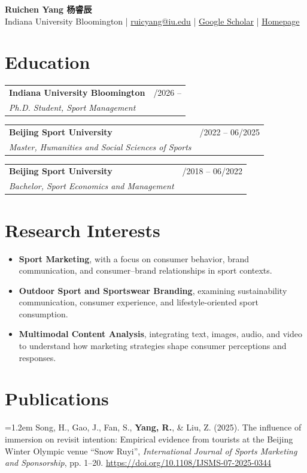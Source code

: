 \documentclass[11pt,letterpaper]{article}
\makeatletter
\newcommand{\entry}[4]{%
  \begin{tabularx}{\textwidth}{@{}>{\raggedright\arraybackslash}X>{\raggedleft\arraybackslash}p{1.45in}@{}}
    \textbf{#1} & #2 \\
    \textit{#3} & #4 \\
  \end{tabularx}
}
\newcommand{\publication}[1]{%
  \hangindent=1.2em
  \hangafter=1
  #1\par\vspace{0.45em}
}
\makeatother
\begin{document}
\begin{center}
  {\LARGE\bfseries Ruichen Yang 杨睿辰}\\[0.45em]
  Indiana University Bloomington \;|\;
  \href{mailto:ruicyang@iu.edu}{ruicyang@iu.edu} \;|\;
  \href{https://scholar.google.com/citations?user=i4R9ZRsAAAAJ&hl=en&inst=13098912254855678857}{Google Scholar} \;|\;
  \href{https://mukj1.github.io/}{Homepage}
\end{center}

\section*{Education}

\entry
  {Indiana University Bloomington}
  {08/2026 --}
  {Ph.D. Student, Sport Management}
  {}

\vspace{0.35em}

\entry
  {Beijing Sport University}
  {08/2022 -- 06/2025}
  {Master, Humanities and Social Sciences of Sports}
  {}

\vspace{0.35em}

\entry
  {Beijing Sport University}
  {08/2018 -- 06/2022}
  {Bachelor, Sport Economics and Management}
  {}

\section*{Research Interests}

\begin{itemize}
  \item \textbf{Sport Marketing}, with a focus on consumer behavior, brand communication, and consumer--brand relationships in sport contexts.
  \item \textbf{Outdoor Sport and Sportswear Branding}, examining sustainability communication, consumer experience, and lifestyle-oriented sport consumption.
  \item \textbf{Multimodal Content Analysis}, integrating text, images, audio, and video to understand how marketing strategies shape consumer perceptions and responses.
\end{itemize}

\section*{Publications}

\publication{Song, H., Gao, J., Fan, S., \textbf{Yang, R.}, \& Liu, Z. (2025). The influence of immersion on revisit intention: Empirical evidence from tourists at the Beijing Winter Olympic venue ``Snow Ruyi'', \textit{International Journal of Sports Marketing and Sponsorship}, pp. 1--20. \url{https://doi.org/10.1108/IJSMS-07-2025-0344}}
\end{document}

